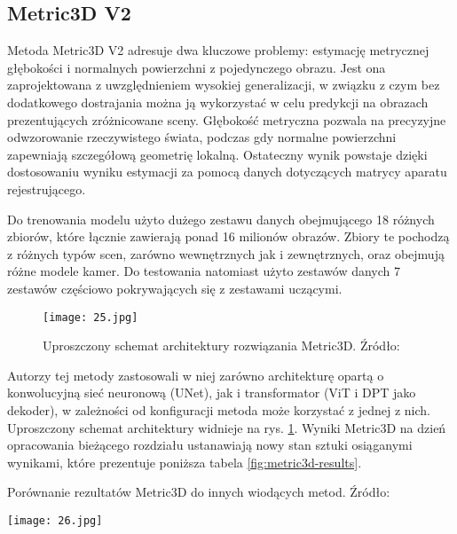 \subsection{Metric3D V2}
Metoda Metric3D V2 \cite{hu2024} adresuje dwa kluczowe problemy: estymację metrycznej głębokości i normalnych powierzchni z pojedynczego obrazu. Jest ona zaprojektowana z uwzględnieniem wysokiej generalizacji, w związku z czym bez dodatkowego dostrajania można ją wykorzystać w celu predykcji na obrazach prezentujących zróżnicowane sceny.
Głębokość metryczna pozwala na precyzyjne odwzorowanie rzeczywistego świata, podczas gdy normalne powierzchni zapewniają szczegółową geometrię lokalną. Ostateczny wynik powstaje dzięki dostosowaniu wyniku estymacji za pomocą danych dotyczących matrycy aparatu rejestrującego. 

Do trenowania modelu użyto dużego zestawu danych obejmującego 18 różnych zbiorów, które łącznie zawierają ponad 16 milionów obrazów. Zbiory te pochodzą z różnych typów scen, zarówno wewnętrznych jak i zewnętrznych, oraz obejmują różne modele kamer. Do testowania natomiast użyto zestawów danych 7 zestawów częściowo pokrywających się z zestawami uczącymi.

\begin{figure}[H]
    \centering
    \texttt{[image: 25.jpg]}
    \caption{Uproszczony schemat architektury rozwiązania Metric3D. Źródło: \cite{hu2024}}
    \label{fig:metric3d-schema}
\end{figure}

Autorzy tej metody zastosowali w niej zarówno architekturę opartą o konwolucyjną sieć neuronową (UNet), jak i transformator (ViT i DPT jako dekoder), w zależności od konfiguracji metoda może korzystać z jednej z nich. Uproszczony schemat architektury widnieje na rys. \ref{fig:metric3d-schema}. Wyniki Metric3D na dzień opracowania bieżącego rozdziału ustanawiają nowy stan sztuki osiąganymi wynikami, które prezentuje poniższa tabela \ref{fig:metric3d-results}.
\begin{table}[H]
    \centering
    \caption{Porównanie rezultatów Metric3D do innych wiodących metod. Źródło: \cite{hu2024}}
    \texttt{[image: 26.jpg]}
    \label{fig:metric3d-results}
\end{table}

